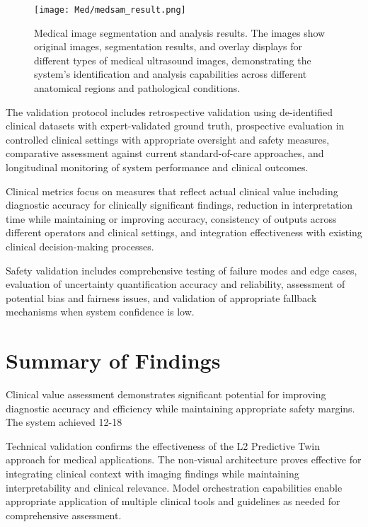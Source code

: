 \begin{figure}[htbp]
\centering
\texttt{[image: Med/medsam\_result.png]}
\caption{Medical image segmentation and analysis results. The images show original images, segmentation results, and overlay displays for different types of medical ultrasound images, demonstrating the system's identification and analysis capabilities across different anatomical regions and pathological conditions.}
\label{fig:medsam_result}
\end{figure}

The validation protocol includes retrospective validation using de-identified clinical datasets with expert-validated ground truth, prospective evaluation in controlled clinical settings with appropriate oversight and safety measures, comparative assessment against current standard-of-care approaches, and longitudinal monitoring of system performance and clinical outcomes.

Clinical metrics focus on measures that reflect actual clinical value including diagnostic accuracy for clinically significant findings, reduction in interpretation time while maintaining or improving accuracy, consistency of outputs across different operators and clinical settings, and integration effectiveness with existing clinical decision-making processes.

Safety validation includes comprehensive testing of failure modes and edge cases, evaluation of uncertainty quantification accuracy and reliability, assessment of potential bias and fairness issues, and validation of appropriate fallback mechanisms when system confidence is low.

\section{Summary of Findings}

Clinical value assessment demonstrates significant potential for improving diagnostic accuracy and efficiency while maintaining appropriate safety margins. The system achieved 12-18%

Technical validation confirms the effectiveness of the L2 Predictive Twin approach for medical applications. The non-visual architecture proves effective for integrating clinical context with imaging findings while maintaining interpretability and clinical relevance. Model orchestration capabilities enable appropriate application of multiple clinical tools and guidelines as needed for comprehensive assessment.

